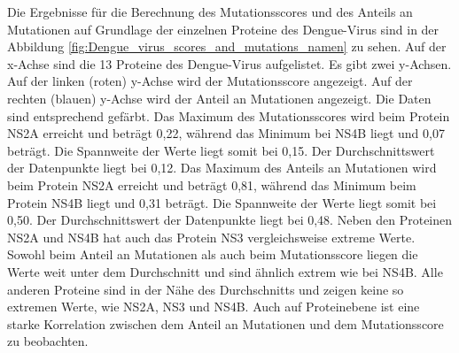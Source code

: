 \documentclass[german,version-2022-01]{uzl-thesis}
\begin{document}
Die Ergebnisse f\"ur die Berechnung des Mutationsscores und des Anteils an Mutationen auf Grundlage der einzelnen Proteine des Dengue-Virus sind in der Abbildung \ref{fig:Dengue_virus_scores_and_mutations_namen} zu sehen. Auf der x-Achse sind die 13 Proteine des Dengue-Virus aufgelistet. Es gibt zwei y-Achsen. Auf der linken (roten) y-Achse wird der Mutationsscore angezeigt. Auf der rechten (blauen) y-Achse wird der Anteil an Mutationen angezeigt. Die Daten sind entsprechend gef\"arbt. Das Maximum des Mutationsscores wird beim Protein NS2A erreicht und betr\"agt 0,22, w\"ahrend das Minimum bei NS4B liegt und 0,07 betr\"agt. Die Spannweite der Werte liegt somit bei 0,15. Der Durchschnittswert der Datenpunkte liegt bei 0,12. Das Maximum des Anteils an Mutationen wird beim Protein NS2A erreicht und betr\"agt 0,81, w\"ahrend das Minimum beim Protein NS4B liegt und 0,31 betr\"agt. Die Spannweite der Werte liegt somit bei 0,50. Der Durchschnittswert der Datenpunkte liegt bei 0,48. Neben den Proteinen NS2A und NS4B hat auch das Protein NS3 vergleichsweise extreme Werte. Sowohl beim Anteil an Mutationen als auch beim Mutationsscore liegen die Werte weit unter dem Durchschnitt und sind \"ahnlich extrem wie bei NS4B. Alle anderen Proteine sind in der N\"ahe des Durchschnitts und zeigen keine so extremen Werte, wie NS2A, NS3 und NS4B. Auch auf Proteinebene ist eine starke Korrelation zwischen dem Anteil an Mutationen und dem Mutationsscore zu beobachten.
\end{document}
